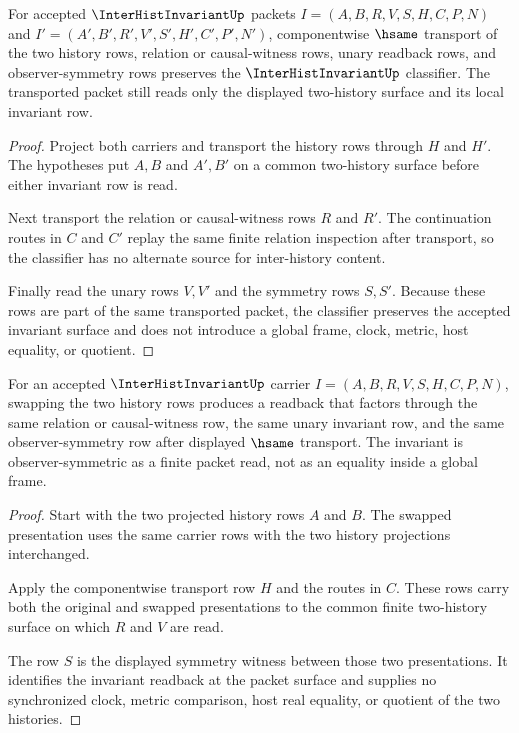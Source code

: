 \begin{theorem}
\label{thm:interhist-invariant-hsame-stability}
For accepted $\InterHistInvariantUp$ packets $I=(A,B,R,V,S,H,C,P,N)$ and $I'=(A',B',R',V',S',H',C',P',N')$, componentwise $\hsame$ transport of the two history rows, relation or causal-witness rows, unary readback rows, and observer-symmetry rows preserves the $\InterHistInvariantUp$ classifier. The transported packet still reads only the displayed two-history surface and its local invariant row.
\end{theorem}
\begin{proof}
Project both carriers and transport the history rows through $H$ and $H'$. The hypotheses put $A,B$ and $A',B'$ on a common two-history surface before either invariant row is read.

Next transport the relation or causal-witness rows $R$ and $R'$. The continuation routes in $C$ and $C'$ replay the same finite relation inspection after transport, so the classifier has no alternate source for inter-history content.

Finally read the unary rows $V,V'$ and the symmetry rows $S,S'$. Because these rows are part of the same transported packet, the classifier preserves the accepted invariant surface and does not introduce a global frame, clock, metric, host equality, or quotient.
\end{proof}

\begin{theorem}
\label{thm:interhist-invariant-observer-symmetry}
For an accepted $\InterHistInvariantUp$ carrier $I=(A,B,R,V,S,H,C,P,N)$, swapping the two history rows produces a readback that factors through the same relation or causal-witness row, the same unary invariant row, and the same observer-symmetry row after displayed $\hsame$ transport. The invariant is observer-symmetric as a finite packet read, not as an equality inside a global frame.
\end{theorem}
\begin{proof}
Start with the two projected history rows $A$ and $B$. The swapped presentation uses the same carrier rows with the two history projections interchanged.

Apply the componentwise transport row $H$ and the routes in $C$. These rows carry both the original and swapped presentations to the common finite two-history surface on which $R$ and $V$ are read.

The row $S$ is the displayed symmetry witness between those two presentations. It identifies the invariant readback at the packet surface and supplies no synchronized clock, metric comparison, host real equality, or quotient of the two histories.
\end{proof}

